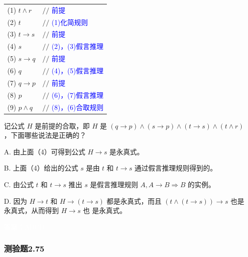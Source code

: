 \documentclass[UTF8, heading=true]{ctexart}
\begin{document}
\begin{table}[H]
  \centering
  \renewcommand{\arraystretch}{1.5}
  \begin{tabular}{ll}
    (1)  $t \wedge r$ & $/ / $ \textcolor{blue}{{前提}} \\
    (2)  $t$ & $/ / $ \textcolor{blue}{{(1)化简规则}} \\
    (3)  $t \rightarrow s$ & $/ / $ \textcolor{blue}{{前提}} \\
    (4)  $s$ & $/ / $ \textcolor{blue}{{(2)，(3)假言推理}} \\
    (5)  $s \rightarrow q$ & $/ / $ \textcolor{blue}{{前提}} \\
    (6)  $q$ & $/ / $ \textcolor{blue}{{(4)，(5)假言推理}} \\
    (7)  $q \rightarrow p$ & $/ / $ \textcolor{blue}{{前提}} \\
    (8)  $p$ & $/ / $ \textcolor{blue}{{(6)，(7)假言推理}} \\
    (9)  $p \wedge q$ & $/ / $ \textcolor{blue}{{(8)，(6)合取规则}} \\
  \end{tabular}
\end{table}


记公式 $H$ 是前提的合取，即 $H$ 是 $(q \rightarrow p) \wedge(s \rightarrow p) \wedge(t \rightarrow s) \wedge(t \wedge r)$ ，下面哪些说法是正确的？

A. 由上面（4）可得到公式 $H \rightarrow s$ 是永真式。

B. 上面（4）给出的公式 $s$ 是由 $t$ 和 $t \rightarrow s$ 通过假言推理规则得到的。

C. 由公式 $t$ 和 $t \rightarrow s$ 推出 $s$ 是假言推理规则 $A, A \rightarrow B \Longrightarrow B$ 的实例。

D. 因为 $H \rightarrow t$ 和 $H \rightarrow(t \rightarrow s)$ 都是永真式，而且 $(t \wedge(t \rightarrow s)) \rightarrow s$ 也是永真式，从而得到 $H \rightarrow s$ 也
是永真式。

\textcolor{white}{答案：ABCD}

\subsubsection{测验题2.75}
\end{document}

